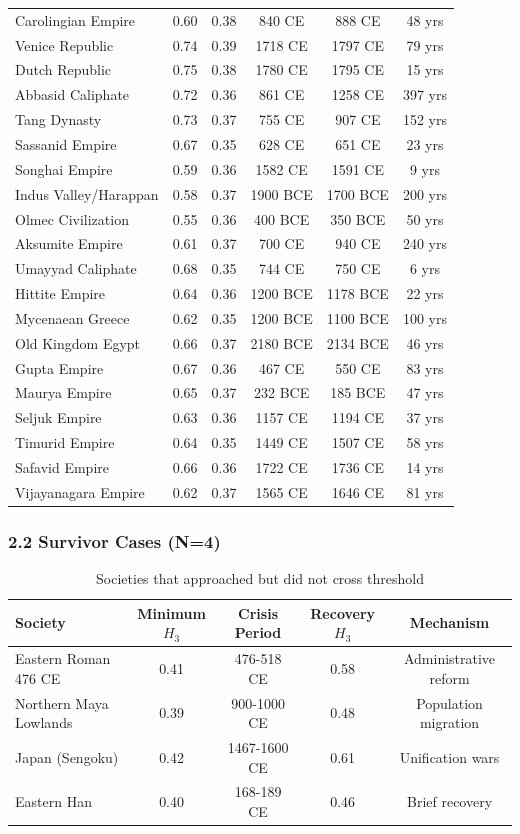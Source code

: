 \documentclass[11pt,a4paper]{article}
\newcommand{\Hthree}{H_3}
\begin{document}
\begin{longtable}{lccccc}
Carolingian Empire & 0.60 & 0.38 & 840 CE & 888 CE & 48 yrs \\
Venice Republic & 0.74 & 0.39 & 1718 CE & 1797 CE & 79 yrs \\
Dutch Republic & 0.75 & 0.38 & 1780 CE & 1795 CE & 15 yrs \\
Abbasid Caliphate & 0.72 & 0.36 & 861 CE & 1258 CE & 397 yrs \\
Tang Dynasty & 0.73 & 0.37 & 755 CE & 907 CE & 152 yrs \\
Sassanid Empire & 0.67 & 0.35 & 628 CE & 651 CE & 23 yrs \\
Songhai Empire & 0.59 & 0.36 & 1582 CE & 1591 CE & 9 yrs \\
Indus Valley/Harappan & 0.58 & 0.37 & 1900 BCE & 1700 BCE & 200 yrs \\
Olmec Civilization & 0.55 & 0.36 & 400 BCE & 350 BCE & 50 yrs \\
Aksumite Empire & 0.61 & 0.37 & 700 CE & 940 CE & 240 yrs \\
Umayyad Caliphate & 0.68 & 0.35 & 744 CE & 750 CE & 6 yrs \\
Hittite Empire & 0.64 & 0.36 & 1200 BCE & 1178 BCE & 22 yrs \\
Mycenaean Greece & 0.62 & 0.35 & 1200 BCE & 1100 BCE & 100 yrs \\
Old Kingdom Egypt & 0.66 & 0.37 & 2180 BCE & 2134 BCE & 46 yrs \\
Gupta Empire & 0.67 & 0.36 & 467 CE & 550 CE & 83 yrs \\
Maurya Empire & 0.65 & 0.37 & 232 BCE & 185 BCE & 47 yrs \\
Seljuk Empire & 0.63 & 0.36 & 1157 CE & 1194 CE & 37 yrs \\
Timurid Empire & 0.64 & 0.35 & 1449 CE & 1507 CE & 58 yrs \\
Safavid Empire & 0.66 & 0.36 & 1722 CE & 1736 CE & 14 yrs \\
Vijayanagara Empire & 0.62 & 0.37 & 1565 CE & 1646 CE & 81 yrs \\
\bottomrule
\end{longtable}

\subsubsection{2.2 Survivor Cases (N=4)}

\begin{table}[H]
\centering
\caption{Societies that approached but did not cross threshold}
\begin{tabular}{lcccc}
\toprule
\textbf{Society} & \textbf{Minimum $\Hthree$} & \textbf{Crisis Period} & \textbf{Recovery $\Hthree$} & \textbf{Mechanism} \\
\midrule
Eastern Roman 476 CE & 0.41 & 476-518 CE & 0.58 & Administrative reform \\
Northern Maya Lowlands & 0.39 & 900-1000 CE & 0.48 & Population migration \\
Japan (Sengoku) & 0.42 & 1467-1600 CE & 0.61 & Unification wars \\
Eastern Han & 0.40 & 168-189 CE & 0.46 & Brief recovery \\
\bottomrule
\end{tabular}
\end{table}
\end{document}
